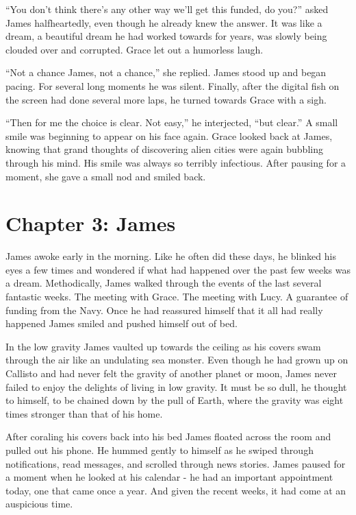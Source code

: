\documentclass[12pt]{article} %
\begin{document}
``You don't think there's any other way we'll get this funded, do you?'' asked James halfheartedly, even though he already knew the answer. It was like a dream, a beautiful dream he had worked towards for years, was slowly being clouded over and corrupted. Grace let out a humorless laugh.

``Not a chance James, not a chance,'' she replied. James stood up and began pacing. For several long moments he was silent. Finally, after the digital fish on the screen had done several more laps, he turned towards Grace with a sigh.

``Then for me the choice is clear. Not easy,'' he interjected, ``but clear.'' A small smile was beginning to appear on his face again. Grace looked back at James, knowing that grand thoughts of discovering alien cities were again bubbling through his mind. His smile was always so terribly infectious. After pausing for a moment, she gave a small nod and smiled back.

\newpage
\section{Chapter 3: James}
James awoke early in the morning. Like he often did these days, he blinked his eyes a few times and wondered if what had happened over the past few weeks was a dream. Methodically, James walked through the events of the last several fantastic weeks. The meeting with Grace. The meeting with Lucy. A guarantee of funding from the Navy. Once he had reassured himself that it all had really happened James smiled and pushed himself out of bed.

In the low gravity James vaulted up towards the ceiling as his covers swam through the air like an undulating sea monster. Even though he had grown up on Callisto and had never felt the gravity of another planet or moon, James never failed to enjoy the delights of living in low gravity. It must be so dull, he thought to himself, to be chained down by the pull of Earth, where the gravity was eight times stronger than that of his home.

After coraling his covers back into his bed James floated across the room and pulled out his phone. He hummed gently to himself as he swiped through notifications, read messages, and scrolled through news stories. James paused for a moment when he looked at his calendar - he had an important appointment today, one that came once a year. And given the recent weeks, it had come at an auspicious time.
\end{document}
